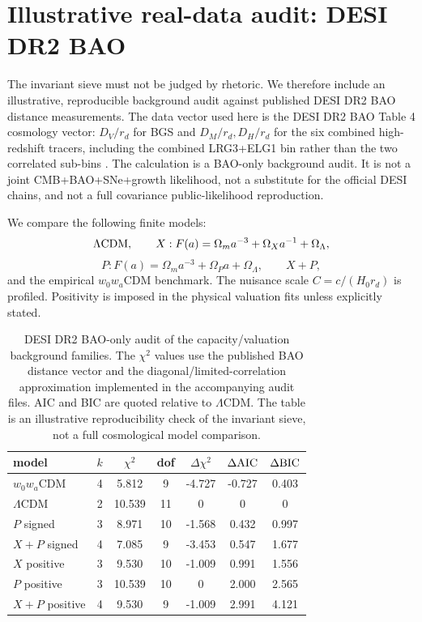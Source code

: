 \documentclass[aps,prd,reprint,nofootinbib,superscriptaddress,floatfix]{revtex4-2}
\numberwithin{equation}{section}
\theoremstyle{definition}
\theoremstyle{plain}
\begin{document}
\section{Illustrative real-data audit: DESI DR2 BAO}\label{sec:real-data-audit}

The invariant sieve must not be judged by rhetoric.  We therefore include an illustrative, reproducible background audit against published DESI DR2 BAO distance measurements.  The data vector used here is the DESI DR2 BAO Table 4 cosmology vector: \(D_V/r_d\) for BGS and \(D_M/r_d,D_H/r_d\) for the six combined high-redshift tracers, including the combined LRG3+ELG1 bin rather than the two correlated sub-bins \cite{DESIDR2BAO2025}.  The calculation is a BAO-only background audit.  It is not a joint CMB+BAO+SNe+growth likelihood, not a substitute for the official DESI chains, and not a full covariance public-likelihood reproduction.

We compare the following finite models:
\[
\Lambda{\rm CDM},\qquad
X:{F(a)=\Omega_m a^{-3}+\Omega_Xa^{-1}+\Omega_\Lambda},
\]
\[
P:{F(a)=\Omega_m a^{-3}+\Omega_Pa+\Omega_\Lambda},
\qquad
X+P,
\]
and the empirical \(w_0w_a\)CDM benchmark.  The nuisance scale \(C=c/(H_0r_d)\) is profiled.  Positivity is imposed in the physical valuation fits unless explicitly stated.

\begin{table}[t]
\caption{DESI DR2 BAO-only audit of the capacity/valuation background families.  The \(\chi^2\) values use the published BAO distance vector and the diagonal/limited-correlation approximation implemented in the accompanying audit files.  AIC and BIC are quoted relative to \(\Lambda\)CDM.  The table is an illustrative reproducibility check of the invariant sieve, not a full cosmological model comparison.}
\label{tab:bao-audit}
\begin{ruledtabular}
\begin{tabular}{lcccccc}
model & \(k\) & \(\chi^2\) & dof & \(\Delta\chi^2\) & \(\Delta{\rm AIC}\) & \(\Delta{\rm BIC}\)\\
\hline
\(w_0w_a\)CDM & 4 & 5.812 & 9 & -4.727 & -0.727 & 0.403\\
\(\Lambda\)CDM & 2 & 10.539 & 11 & 0 & 0 & 0\\
\(P\) signed & 3 & 8.971 & 10 & -1.568 & 0.432 & 0.997\\
\(X+P\) signed & 4 & 7.085 & 9 & -3.453 & 0.547 & 1.677\\
\(X\) positive & 3 & 9.530 & 10 & -1.009 & 0.991 & 1.556\\
\(P\) positive & 3 & 10.539 & 10 & 0 & 2.000 & 2.565\\
\(X+P\) positive & 4 & 9.530 & 9 & -1.009 & 2.991 & 4.121
\end{tabular}
\end{ruledtabular}
\end{table}
\end{document}
